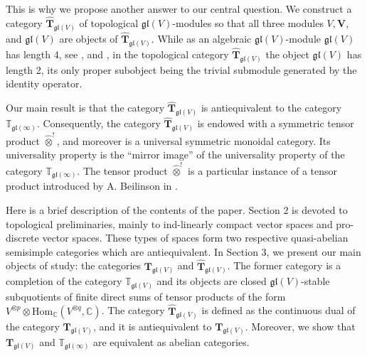 \documentclass[12pt,reqno]{amsart}
\newcommand{\CC}{\mathbb{C}}
\newcommand{\TT}{\mathbb{T}}
\theoremstyle{definition}
\theoremstyle{remark}
\begin{document}
	This is why we propose another answer to our central question. We construct a category $\widehat{\mathbf{T}}_{\mathfrak{gl}(V)}$ of topological $ \mathfrak{gl}(V) $-modules so that all three modules $ V, \mathbf{V} $, and $ \mathfrak{gl}(V) $ are objects of $\widehat{\mathbf{T}}_{\mathfrak{gl}(V)}$. While as an algebraic $ \mathfrak{gl}(V) $-module $ \mathfrak{gl}(V) $ has length 4, see \cite{BHB}, \cite{Mac} and \cite{HZ}, in the topological category $\widehat{\mathbf{T}}_{\mathfrak{gl}(V)}$ the object $ \mathfrak{gl}(V) $ has length 2, its only proper subobject being the trivial submodule generated by the identity operator.
	
	Our main result is that the category $\widehat{\mathbf{T}}_{\mathfrak{gl}(V)}$ is antiequivalent to the category $\TT_{\mathfrak{gl}(\infty)}$. Consequently, the category $\widehat{\mathbf{T}}_{\mathfrak{gl}(V)}$ is endowed with a symmetric tensor product $\widehat{\otimes}^!$, and moreover is a universal symmetric monoidal category. Its universality property is the ``mirror image'' of the universality property of the category $\TT_{\mathfrak{gl}(\infty)}$. The tensor product $\widehat{\otimes}^!$ is a particular instance of a tensor product introduced by A. Beilinson in \cite{Bei}.
	
	Here is a brief description of the contents of the paper. Section 2 is devoted to topological preliminaries, mainly to ind-linearly compact vector spaces and pro-discrete vector spaces. These types of spaces form two respective quasi-abelian semisimple categories which are antiequivalent. 
	In Section 3, we present our main objects of study: the categories $\mathbf{T}_{\mathfrak{gl}(V)}$ and $\widehat{\mathbf{T}}_{\mathfrak{gl}(V)}$. The former category is a completion of the category $\mathbb{T}_{\mathfrak{gl}(V)}$ and its objects are closed $ \mathfrak{gl}(V) $-stable subquotients of finite direct sums of tensor products of the form $ V^{\otimes p}\otimes\mathrm{Hom}_{\CC}(V^{\otimes q}, \CC)$. 
	The category $\widehat{\mathbf{T}}_{\mathfrak{gl}(V)}$ is defined as the continuous dual of the category $\mathbf{T}_{\mathfrak{gl}(V)}$, and it is antiequivalent to $\mathbf{T}_{\mathfrak{gl}(V)}$. Moreover, we show that $\mathbf{T}_{\mathfrak{gl}(V)}$ and $\mathbb{T}_{\mathfrak{gl}(\infty)}$ are equivalent as abelian categories.
	
	
	
\end{document}
